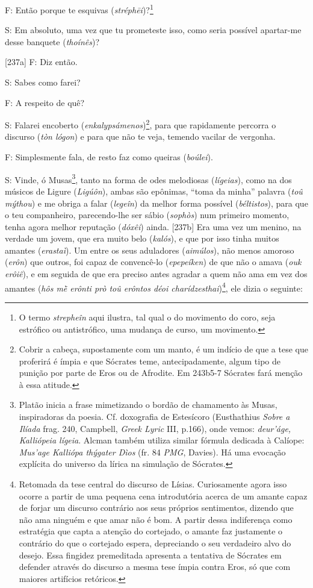 F: Então porque te esquivas (\emph{stréphēi})?\footnote{O termo
  \emph{strepheîn} aqui ilustra, tal qual o do movimento do coro, seja
  estrófico ou antistrófico, uma mudança de curso, um movimento.}

S: Em absoluto, uma vez que tu prometeste isso, como seria possível
apartar-me desse banquete (\emph{thoínês})?

{[}237a{]} F: Diz então.

S: Sabes como farei?

F: A respeito de quê?

S: Falarei encoberto (\emph{enkalypsámenos})\footnote{Cobrir a cabeça,
  supostamente com um manto, é um indício de que a tese que proferirá é
  ímpia e que Sócrates teme, antecipadamente, algum tipo de punição por
  parte de Eros ou de Afrodite. Em 243b5-7 Sócrates fará menção à essa
  atitude.}, para que rapidamente percorra o discurso (\emph{tòn lógon})
e para que não te veja, temendo vacilar de vergonha.

F: Simplesmente fala, de resto faz como queiras (\emph{boúlei}).

S: Vinde, ó Musas\footnote{Platão inicia a frase mimetizando o bordão de
  chamamento às Musas, inspiradoras da poesia. Cf. doxografia de
  Estesícoro (Eusthathius \emph{Sobre a} \emph{Ilíada} frag. 240,
  Campbell, \emph{Greek Lyric} III, p.166), onde vemos: \emph{deur'áge,
  Kalliópeia lígeia}. Alcman também utiliza similar fórmula dedicada à
  Calíope: \emph{Mus'age Kalliópa thýgater Dìos} (fr. 84 \emph{PMG},
  Davies). Há uma evocação explícita do universo da lírica na simulação
  de Sócrates.}, tanto na forma de odes melodiosas (\emph{lígeias}),
como na dos músicos de Ligure (\emph{Ligúôn}), ambas são epônimas,
``toma da minha'' palavra (\emph{toû mýthou}) e me obriga a falar
(\emph{legeîn}) da melhor forma possível (\emph{béltistos}), para que o
teu companheiro, parecendo-lhe ser sábio (\emph{sophòs}) num primeiro
momento, tenha agora melhor reputação (\emph{dóxêi}) ainda. {[}237b{]}
Era uma vez um menino, na verdade um jovem, que era muito belo
(\emph{kalós}), e que por isso tinha muitos amantes (\emph{erastaì}). Um
entre os seus aduladores (\emph{aimúlos}), não menos amoroso
(\emph{erôn}) que outros, foi capaz de convencê-lo (\emph{epepeíken}) de
que não o amava (\emph{ouk} \emph{erôiê}), e em seguida de que era
preciso antes agradar a quem não ama em vez dos amantes (\emph{hôs mḕ
erônti prò toû erôntos déoi charídzesthai})\footnote{Retomada da tese
  central do discurso de Lísias. Curiosamente agora isso ocorre a partir
  de uma pequena cena introdutória acerca de um amante capaz de forjar
  um discurso contrário aos seus próprios sentimentos, dizendo que não
  ama ninguém e que amar não é bom. A partir dessa indiferença como
  estratégia que capta a atenção do cortejado, o amante faz justamente o
  contrário do que o cortejado espera, depreciando o seu verdadeiro alvo
  do desejo. Essa fingidez premeditada apresenta a tentativa de Sócrates
  em defender através do discurso a mesma tese ímpia contra Eros, só que
  com maiores artifícios retóricos.}, ele dizia o seguinte:


